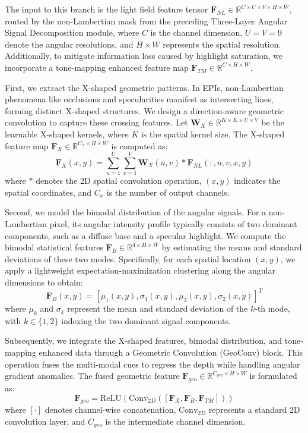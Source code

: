 \documentclass[lettersize,journal]{IEEEtran}
\begin{document}
The input to this branch is the light field feature tensor $\mathbf{F}_{NL} \in \mathbb{R}^{C \times U \times V \times H \times W}$, routed by the non-Lambertian mask from the preceding Three-Layer Angular Signal Decomposition module, where $C$ is the channel dimension, $U=V=9$ denote the angular resolutions, and $H \times W$ represents the spatial resolution. Additionally, to mitigate information loss caused by highlight saturation, we incorporate a tone-mapping enhanced feature map $\mathbf{F}_{TM} \in \mathbb{R}^{C \times H \times W}$.

First, we extract the X-shaped geometric patterns. In EPIs, non-Lambertian phenomena like occlusions and specularities manifest as intersecting lines, forming distinct X-shaped structures. We design a direction-aware geometric convolution to capture these crossing features. Let $\mathbf{W}_{X} \in \mathbb{R}^{K \times K \times U \times V}$ be the learnable X-shaped kernels, where $K$ is the spatial kernel size. The X-shaped feature map $\mathbf{F}_{X} \in \mathbb{R}^{C_{x} \times H \times W}$ is computed as:
\begin{equation}
\mathbf{F}_{X}(x,y) = \sum_{u=1}^{U} \sum_{v=1}^{V} \mathbf{W}_{X}(u,v) * \mathbf{F}_{NL}(:, u, v, x, y)
\label{eq:ch3_12}
\end{equation}
where $*$ denotes the 2D spatial convolution operation, $(x,y)$ indicates the spatial coordinates, and $C_{x}$ is the number of output channels.

Second, we model the bimodal distribution of the angular signals. For a non-Lambertian pixel, its angular intensity profile typically consists of two dominant components, such as a diffuse base and a specular highlight. We compute the bimodal statistical features $\mathbf{F}_{B} \in \mathbb{R}^{4 \times H \times W}$ by estimating the means and standard deviations of these two modes. Specifically, for each spatial location $(x,y)$, we apply a lightweight expectation-maximization clustering along the angular dimensions to obtain:
\begin{equation}
\mathbf{F}_{B}(x,y) = \left[ \mu_1(x,y), \sigma_1(x,y), \mu_2(x,y), \sigma_2(x,y) \right]^T
\label{eq:ch3_13}
\end{equation}
where $\mu_k$ and $\sigma_k$ represent the mean and standard deviation of the $k$-th mode, with $k \in \{1, 2\}$ indexing the two dominant signal components.

Subsequently, we integrate the X-shaped features, bimodal distribution, and tone-mapping enhanced data through a Geometric Convolution (GeoConv) block. This operation fuses the multi-modal cues to regress the depth while handling angular gradient anomalies. The fused geometric feature $\mathbf{F}_{geo} \in \mathbb{R}^{C_{geo} \times H \times W}$ is formulated as:
\begin{equation}
\mathbf{F}_{geo} = \text{ReLU}\left( \text{Conv}_{2D}\left( \left[ \mathbf{F}_{X}, \mathbf{F}_{B}, \mathbf{F}_{TM} \right] \right) \right)
\label{eq:ch3_14}
\end{equation}
where $[\cdot]$ denotes channel-wise concatenation, $\text{Conv}_{2D}$ represents a standard 2D convolution layer, and $C_{geo}$ is the intermediate channel dimension.
\end{document}
